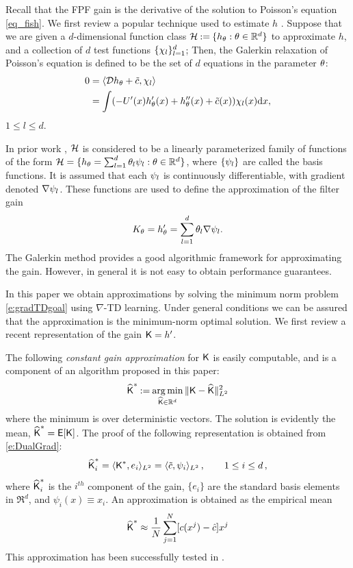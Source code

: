 Recall that the FPF gain is the derivative of the solution to Poisson's equation \eqref{eq_fish}.
We first review a popular technique used to estimate $h$ \cite{yanmehmey13,yanlaumehmey16}.
Suppose that we are given a $d$-dimensional  function class
${\cal H}  \mathbin{:=} \{h_{\theta} : \theta \in \mathbb{R}^d\}$ to approximate $h$, and a collection of $d$ test functions $\{\chi_{l}\}_{l=1}^{d}$; Then, the Galerkin relaxation of Poisson's equation is defined to be the set of $d$ equations in the parameter $\theta$:
\begin{equation}
\begin{aligned}
0 &= \langle \clD h_{\param}+\tilc, \test_{l} \rangle \\
&= \int (-U'(x) h_{\param}'(x)+ h_{\param}''(x)+\tilc (x))\test_{l}(x) \ud x,
\end{aligned}
\label{eq_weak_formulation}
\end{equation}
$ 1\leq l \leq d$.


In prior work \cite{yanmehmey13,yanlaumehmey16}, ${\cal H}$ is considered to be a linearly parameterized family of functions of the form ${\cal H} =\{ h_{\theta} = \sum_{l=1}^{d}\theta_{l}\psi_{l} : \theta\in\mathbb{R}^d\}$, where $\{\psi_l\}$ are called the basis functions. It is assumed that each $\psi_l$ is continuously differentiable,  with gradient denoted   $\nabla \psi_{l} $. These   functions are used to define the approximation of the filter gain
\begin{equation}
K_\param = h_{\param}' = \sum_{l=1}^{d}\param_{l}\gradbasis_{l}.
\label{eq_basis_galerkin}
\end{equation}
The
Galerkin method provides a good algorithmic framework for approximating the gain. However, in general it is not easy to obtain performance guarantees.

In this paper we obtain approximations by solving  the minimum norm problem \eqref{e:gradTDgoal} using $\nabla$-TD learning.  Under general conditions we can be assured that the approximation is the minimum-norm optimal solution.   We first review a recent representation of the gain $\text{\sf K} = h'$.


The following \textit{constant gain approximation}  for $\text{\sf K}$ is easily computable, and is a component of an algorithm proposed in this paper:
\[
\widehat{\text{\sf K}}^* \mathbin{:=} \mathop{\rm arg{\,}min}_{\widehat{\text{\sf K}} \in \mathbb{R}^d} \| \text{\sf K} - \widehat{\text{\sf K}} \|^2_{L^{2}}
\]
where the minimum is over deterministic vectors.   The solution is evidently the mean,  $\widehat{\text{\sf K}}^* = {\sf E}[\text{\sf K}]$.
The proof of the following representation is obtained from \eqref{e:DualGrad}:
\[
\widehat{\text{\sf K}}^*_ i =  \langle \text{\sf K}^* ,e_i \rangle_{L^2}
=
\langle \tilde c ,\psi_i \rangle_{L^2}\,, \qquad 1\le i\le d\,,
\]
where $\widehat{\text{\sf K}}^*_i$ is the $i^{th}$ component of the gain, $\{e_i\}$ are the standard basis elements in $\Re^d$, and  $ \psi_i(x)\equiv x_i$.
An approximation is obtained as the empirical mean
\begin{equation}
\hakFPF^* \approx \frac{1}{N} \sum_{j=1}^N [ c(x^j) - \hac ]x^j
\label{e:gain_const_approx}
\end{equation}
This approximation has been successfully tested in \cite{tilghiomeh13}.

